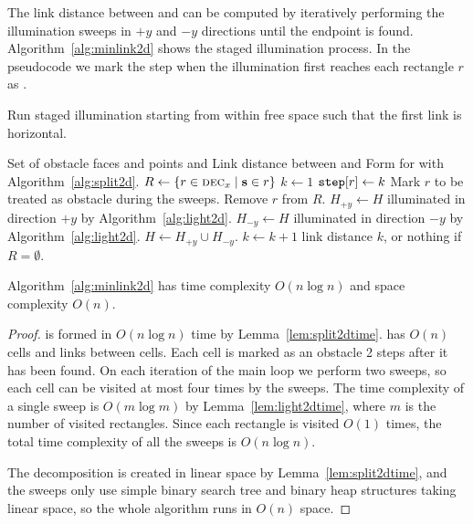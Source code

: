 \documentclass[english,gradu]{tktltiki2018}
\begin{document}
The link distance between \spt and \ept can be computed by iteratively performing the illumination sweeps in $+y$ and $-y$ directions until the endpoint is found.
Algorithm~\ref{alg:minlink2d} shows the staged illumination process.
In the pseudocode we mark the step when the illumination first reaches each rectangle $r$ as .

\begin{algorithm}
\caption{Run staged illumination starting from \spt within free space \fspace such that the first link is horizontal.}\label{alg:minlink2d}
\begin{algorithmic}
\Require Set of obstacle faces and points \spt and \ept
\Ensure Link distance between \spt and \ept
\State Form  for \fspace with Algorithm~\ref{alg:split2d}.
\State $R\gets\left\{r\in\textsc{dec}_{x} \mid \textbf{s}\in r\right\}$
\State $k\gets 1$
			\State $\texttt{step}{[r]}\gets k$
			\State Mark $r$ to be treated as obstacle during the sweeps.
			\State Remove $r$ from $R$.
		\EndIf
	\EndFor
	\State $H_{+y}\gets H$ illuminated in direction $+y$ by Algorithm~\ref{alg:light2d}.
	\State $H_{-y}\gets H$ illuminated in direction $-y$ by Algorithm~\ref{alg:light2d}.
	\State $H\gets H_{+y}\cup H_{-y}$.
	\State $k\gets k+1$
\EndWhile
\State \Return link distance $k$, or nothing if $R=\emptyset$.
\end{algorithmic}
\end{algorithm}

\begin{theo}Algorithm~\ref{alg:minlink2d} has time complexity $O(n\log n)$ and space complexity $O(n)$.\end{theo}
\begin{proof}
 is formed in $O(n\log n)$ time by Lemma~\ref{lem:split2dtime}.
 has $O(n)$ cells and links between cells.
Each cell is marked as an obstacle 2 steps after it has been found.
On each iteration of the main loop we perform two sweeps, so each cell can be visited at most four times by the sweeps.
The time complexity of a single sweep is $O(m\log m)$ by Lemma~\ref{lem:light2dtime}, where $m$ is the number of visited rectangles.
Since each rectangle is visited $O(1)$ times, the total time complexity of all the sweeps is $O(n\log n)$.

The decomposition is created in linear space by Lemma~\ref{lem:split2dtime}, and the sweeps only use simple binary search tree and binary heap structures taking linear space, so the whole algorithm runs in $O(n)$ space.
\end{proof}
\end{document}
